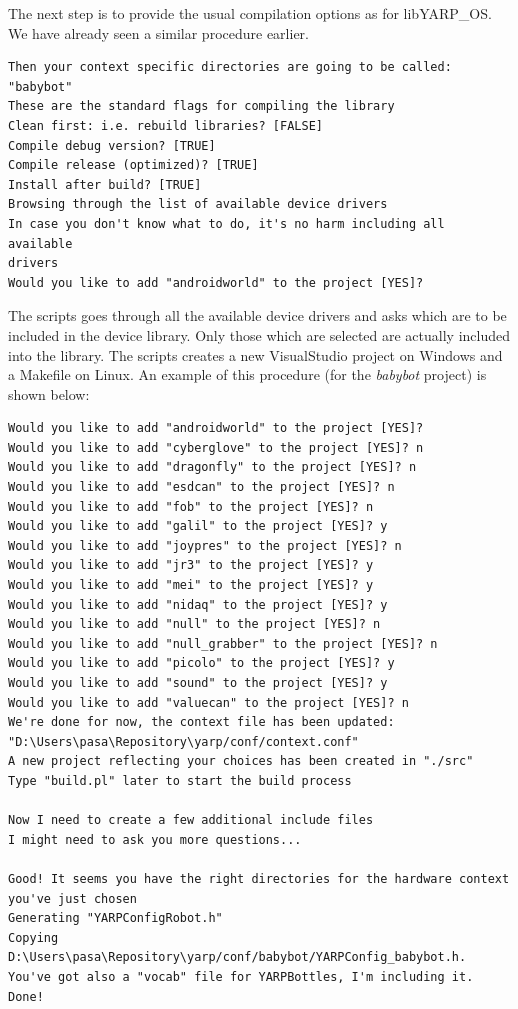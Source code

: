 The next step is to provide the usual compilation options as for libYARP\_OS. We have already seen a similar procedure earlier.

\begin{verbatim}
Then your context specific directories are going to be called: "babybot"
These are the standard flags for compiling the library
Clean first: i.e. rebuild libraries? [FALSE]
Compile debug version? [TRUE]
Compile release (optimized)? [TRUE]
Install after build? [TRUE]
Browsing through the list of available device drivers
In case you don't know what to do, it's no harm including all available 
drivers
Would you like to add "androidworld" to the project [YES]?
\end{verbatim}

The scripts goes through all the available device drivers and asks which are to be included in the device library. Only those which are selected are actually included into the library. The scripts creates a new VisualStudio project on Windows and a Makefile on Linux. An example of this procedure (for the {\em babybot} project) is shown below:

\begin{verbatim}
Would you like to add "androidworld" to the project [YES]?
Would you like to add "cyberglove" to the project [YES]? n
Would you like to add "dragonfly" to the project [YES]? n
Would you like to add "esdcan" to the project [YES]? n
Would you like to add "fob" to the project [YES]? n
Would you like to add "galil" to the project [YES]? y
Would you like to add "joypres" to the project [YES]? n
Would you like to add "jr3" to the project [YES]? y
Would you like to add "mei" to the project [YES]? y
Would you like to add "nidaq" to the project [YES]? y
Would you like to add "null" to the project [YES]? n
Would you like to add "null_grabber" to the project [YES]? n
Would you like to add "picolo" to the project [YES]? y
Would you like to add "sound" to the project [YES]? y
Would you like to add "valuecan" to the project [YES]? n
We're done for now, the context file has been updated: 
"D:\Users\pasa\Repository\yarp/conf/context.conf"
A new project reflecting your choices has been created in "./src"
Type "build.pl" later to start the build process

Now I need to create a few additional include files
I might need to ask you more questions...

Good! It seems you have the right directories for the hardware context 
you've just chosen
Generating "YARPConfigRobot.h"
Copying D:\Users\pasa\Repository\yarp/conf/babybot/YARPConfig_babybot.h.
You've got also a "vocab" file for YARPBottles, I'm including it.
Done!
\end{verbatim}

